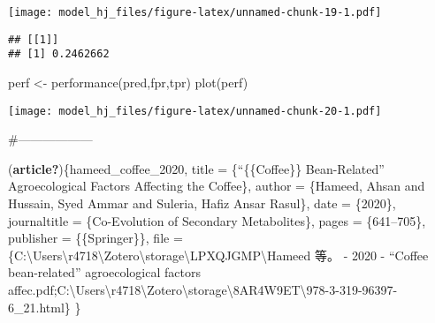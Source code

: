 \documentclass[
]{article}
\newenvironment{Shaded}{\begin{snugshade}}{\end{snugshade}}
\newcommand{\CommentTok}[1]{\textcolor[rgb]{0.56,0.35,0.01}{\textit{#1}}}
\newcommand{\FunctionTok}[1]{\textcolor[rgb]{0.00,0.00,0.00}{#1}}
\newcommand{\NormalTok}[1]{#1}
\newcommand{\OtherTok}[1]{\textcolor[rgb]{0.56,0.35,0.01}{#1}}
\newcommand{\SpecialCharTok}[1]{\textcolor[rgb]{0.00,0.00,0.00}{#1}}
\newcommand{\StringTok}[1]{\textcolor[rgb]{0.31,0.60,0.02}{#1}}
\begin{document}
\texttt{[image: model\_hj\_files/figure-latex/unnamed-chunk-19-1.pdf]}

\begin{Shaded}
\end{Shaded}

\begin{verbatim}
## [[1]]
## [1] 0.2462662
\end{verbatim}

\begin{Shaded}
\begin{Highlighting}[]
\NormalTok{perf }\OtherTok{\textless{}{-}} \FunctionTok{performance}\NormalTok{(pred,}\StringTok{\textquotesingle{}fpr\textquotesingle{}}\NormalTok{,}\StringTok{\textquotesingle{}tpr\textquotesingle{}}\NormalTok{)}
\FunctionTok{plot}\NormalTok{(perf)}
\end{Highlighting}
\end{Shaded}

\texttt{[image: model\_hj\_files/figure-latex/unnamed-chunk-20-1.pdf]}

\#------------------

(\textbf{article?})\{hameed\_coffee\_2020, title = \{``\{\{Coffee\}\}
Bean-Related'' Agroecological Factors Affecting the Coffee\}, author =
\{Hameed, Ahsan and Hussain, Syed Ammar and Suleria, Hafiz Ansar
Rasul\}, date = \{2020\}, journaltitle = \{Co-Evolution of Secondary
Metabolites\}, pages = \{641--705\}, publisher = \{\{Springer\}\}, file
=
\{C:\textbackslash Users\textbackslash r4718\textbackslash Zotero\textbackslash storage\textbackslash LPXQJGMP\textbackslash Hameed
等。 - 2020 - ``Coffee bean-related'' agroecological factors
affec.pdf;C:\textbackslash Users\textbackslash r4718\textbackslash Zotero\textbackslash storage\textbackslash8AR4W9ET\textbackslash978-3-319-96397-6\_21.html\}
\}
\end{document}
